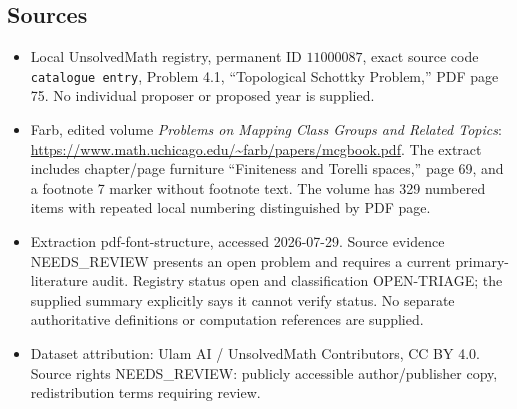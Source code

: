 \documentclass[11pt]{article}
\begin{document}
\subsection{Sources}
\begin{itemize}
\item Local UnsolvedMath registry, permanent ID \(11000087\), exact source code \texttt{catalogue entry}, Problem 4.1, ``Topological Schottky Problem,'' PDF page 75. No individual proposer or proposed year is supplied.
\item Farb, edited volume \emph{Problems on Mapping Class Groups and Related Topics}: \url{https://www.math.uchicago.edu/~farb/papers/mcgbook.pdf}. The extract includes chapter/page furniture ``Finiteness and Torelli spaces,'' page 69, and a footnote 7 marker without footnote text. The volume has 329 numbered items with repeated local numbering distinguished by PDF page.
\item Extraction pdf-font-structure, accessed 2026-07-29. Source evidence NEEDS\_REVIEW presents an open problem and requires a current primary-literature audit. Registry status open and classification OPEN-TRIAGE; the supplied summary explicitly says it cannot verify status. No separate authoritative definitions or computation references are supplied.
\item Dataset attribution: Ulam AI / UnsolvedMath Contributors, CC BY 4.0. Source rights NEEDS\_REVIEW: publicly accessible author/publisher copy, redistribution terms requiring review.
\end{itemize}
\end{document}
